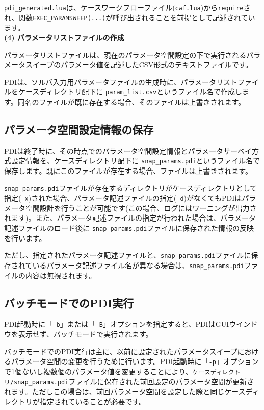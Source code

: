 \documentclass[a4paper,11pt]{jarticle}
\begin{document}
{{\tt pdi\_generated.lua}は、ケースワークフローファイル({\tt cwf.lua})から{\tt require}され、関数{\tt EXEC\_PARAMSWEEP(...)}が呼び出されることを前提として記述されています。\\

\textbf{(4) パラメータリストファイルの作成}

パラメータリストファイルは、現在のパラメータ空間設定の下で実行されるパラメータスイープのパラメータ値を記述したCSV形式のテキストファイルです。

PDIは、ソルバ入力用パラメータファイルの生成時に、パラメータリストファイルをケースディレクトリ配下に {\tt param\_list.csv}というファイル名で作成します。同名のファイルが既に存在する場合、そのファイルは上書きされます。\\


\subsection{パラメータ空間設定情報の保存}

PDIは終了時に、その時点でのパラメータ空間設定情報とパラメータサーベイ方式設定情報を、ケースディレクトリ配下に {\tt snap\_params.pdi}というファイル名で保存します。既にこのファイルが存在する場合、ファイルは上書きされます。

{\tt snap\_params.pdi}ファイルが存在するディレクトリがケースディレクトリとして指定({\tt -x})された場合、パラメータ記述ファイルの指定({\tt -d})がなくてもPDIはパラメータ空間設計を行うことが可能です(この場合、ログにはワーニングが出力されます)。また、パラメータ記述ファイルの指定が行われた場合は、パラメータ記述ファイルのロード後に {\tt snap\_params.pdi}ファイルに保存された情報の反映を行います。

ただし、指定されたパラメータ記述ファイルと、{\tt snap\_params.pdi}ファイルに保存されているパラメータ記述ファイル名が異なる場合は、{\tt snap\_params.pdi}ファイルの内容は無視されます。


\subsection{バッチモードでのPDI実行}

PDI起動時に「{\tt -b}」または「{\tt -B}」オプションを指定すると、PDIはGUIウインドウを表示せず、バッチモードで実行されます。

バッチモードでのPDI実行は主に、以前に設定されたパラメータスイープにおけるパラメータ空間の変更を行うために行います。PDI起動時に「{\tt -p}」オプションで1個ないし複数個のパラメータ値を変更することにより、{\tt ケースディレクトリ/snap\_params.pdi}ファイルに保存された前回設定のパラメータ空間が更新されます。ただしこの場合は、前回パラメータ空間を設定した際と同じケースディレクトリが指定されていることが必要です。

}
\end{document}
